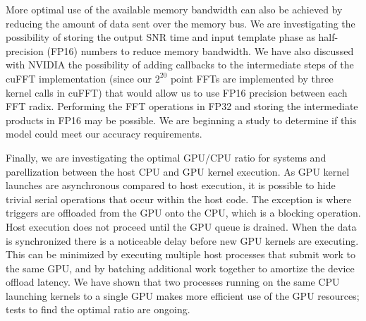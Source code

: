 
More optimal use of the available memory bandwidth can also be achieved by
reducing the amount of data sent over the memory bus. We are investigating the
possibility of storing the output SNR time and input template phase as
half-precision (FP16) numbers to reduce memory bandwidth. We have also
discussed with NVIDIA the possibility of adding callbacks to the intermediate
steps of the cuFFT implementation (since our $2^{20}$ point FFTs are
implemented by three kernel calls in cuFFT) that would allow us to use FP16
precision between each FFT radix. Performing the FFT operations
in FP32 and storing the intermediate products in FP16 may be possible. We are beginning
a study to determine if this model could meet our accuracy requirements.

Finally, we are investigating the optimal GPU/CPU ratio for systems and
parellization between the host CPU and GPU kernel execution. As GPU kernel
launches are asynchronous compared to host execution, it is possible to hide
trivial serial operations that occur within the host code. The exception is
where triggers are offloaded from the GPU onto the CPU, which is a blocking
operation. Host execution does not proceed until the GPU queue is drained.
When the data is synchronized there is a noticeable delay before new GPU
kernels are executing. This can be minimized by executing multiple host
processes that submit work to the same GPU, and by batching additional work
together to amortize the device offload latency. We have shown that two
processes running on the same CPU launching kernels to a single GPU makes more
efficient use of the GPU resources; tests to find the optimal ratio are
ongoing.



